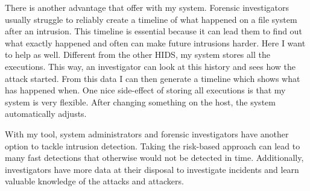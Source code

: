 There is another advantage that offer with my system. Forensic investigators usually struggle to reliably create a timeline of what happened on a file system after an intrusion. This timeline is essential because it can lead them to find out what exactly happened and often can make future intrusions harder. Here I want to help as well. Different from the other HIDS, my system stores all the executions. This way, an investigator can look at this history and sees how the attack started. From this data I can then generate a timeline which shows what has happened when. One nice side-effect of storing all executions is that my system is very flexible. After changing something on the host, the system automatically adjusts.

With my tool, system administrators and forensic investigators have another option to tackle intrusion detection. Taking the risk-based approach can lead to many fast detections that otherwise would not be detected in time. Additionally, investigators have more data at their disposal to investigate incidents and learn valuable knowledge of the attacks and attackers.